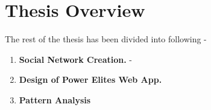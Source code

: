\section{Thesis Overview}
The rest of the thesis has been divided into following -
\begin{enumerate}
    \item \textbf{Social Network Creation.} - 
    \item \textbf{Design of Power Elites Web App.} 
    \item \textbf{Pattern Analysis}

\end{enumerate}



%
%
